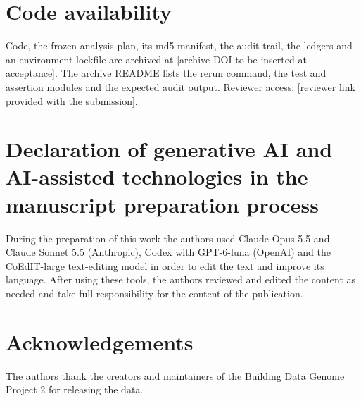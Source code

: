 \section*{Code availability}

Code, the frozen analysis plan, its md5 manifest, the audit trail, the ledgers and an environment lockfile are archived at [archive DOI to be inserted at acceptance]. The archive README lists the rerun command, the test and assertion modules and the expected audit output. Reviewer access: [reviewer link provided with the submission].

\section*{Declaration of generative AI and AI-assisted technologies in the manuscript preparation process}

During the preparation of this work the authors used Claude Opus 5.5 and Claude Sonnet 5.5 (Anthropic), Codex with GPT-6-luna (OpenAI) and the CoEdIT-large text-editing model in order to edit the text and improve its language. After using these tools, the authors reviewed and edited the content as needed and take full responsibility for the content of the publication.

\section*{Acknowledgements}

The authors thank the creators and maintainers of the Building Data Genome Project 2 for releasing the data.
